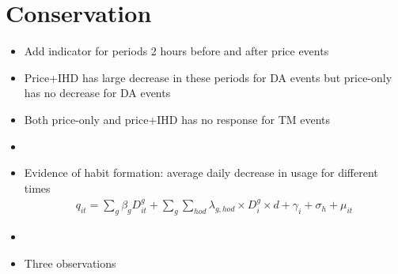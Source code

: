 \documentclass[12pt]{article}
\begin{document}
\section{Conservation}
\begin{itemize}
    \item Add indicator for periods 2 hours before and after price events
    \item Price+IHD has large decrease in these periods for DA events but price-only has no decrease for DA events
    \item Both price-only and price+IHD has no response for TM events
    \item {}
    \item Evidence of habit formation: average daily decrease in usage for different times
        \begin{align*}
            q _ { i t } = \sum _ { g } \beta _ { g } D _ { i t } ^ { g } + \sum _ { g } \sum _ { h o d } \lambda _ { g , h o d } \times D _ { i } ^ { g } \times d + \gamma _ { i } + \sigma _ { h } + \mu _ { i t }
        \end{align*}
    \item {}
    \item Three observations

\end{itemize}
\end{document}
